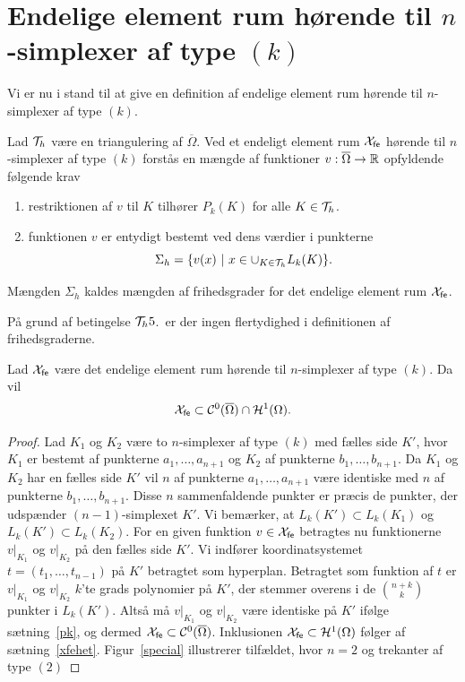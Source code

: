 \section{Endelige element rum hørende til $n$-sim\-plex\-er af type $(k)$}
Vi er nu i stand til at give en definition af endelige element rum
hørende til $n$-simplexer af type $(k)$.
\begin{definition}
Lad ${\cal{T}}_h$ være en triangulering af $\overline{\Omega}$. Ved et endeligt
element rum ${\mathcal{X}}_{\mathsf{fe}}$ hørende til $n$-simplexer af type $(k)$ forstås en
mængde af funktioner $v: \overline{\Omega} \rightarrow \mathbb{R}$ opfyldende 
følgende krav
\begin{enumerate}
 \item restriktionen af $v$ til $K$ tilhører $P_k(K)$ for alle
       $K\in {\cal{T}}_h$.
 \item funktionen $v$ er entydigt bestemt ved dens værdier i punkterne
       \begin{equation}
         \Sigma_h = \{ v(x)\ |\ x \in \cup_{K\in {\cal{T}}_h} L_k(K) \}.
       \end{equation}
\end{enumerate}
Mængden $\Sigma_h$ kaldes mængden af frihedsgrader for det endelige 
element rum ${\mathcal{X}}_{\mathsf{fe}}$.
\end{definition}
\begin{remark}
På grund af betingelse ${\cal{T}}_h 5$.\ er der ingen flertydighed i definitionen
af frihedsgraderne.
\end{remark}
\begin{theorem}
Lad ${\mathcal{X}}_{\mathsf{fe}}$ være det endelige element rum hørende til $n$-sim\-plex\-er
af type $(k)$. Da vil
\begin{equation} 
{\mathcal{X}}_{\mathsf{fe}} \subset {\cal{C}}^0(\overline{\Omega}) \cap {\mathcal H}^1(\Omega) .
\end{equation}
\end{theorem}
\begin{proof}
Lad $K_1$ og $K_2$ være to $n$-simplexer af type $(k)$ med fælles side
$K'$, hvor $K_1$ er bestemt af punkterne $a_1,\ldots,a_{n+1}$ og $K_2$ 
af punkterne $b_1,\ldots,b_{n+1}$. Da $K_1$ og $K_2$ har en fælles 
side $K'$ vil $n$ af punkterne $a_1,\ldots,a_{n+1}$ være identiske med
$n$ af punkterne $b_1,\ldots,b_{n+1}$. Disse $n$ sammenfaldende 
punkter er præcis de punkter, der udspænder $(n-1)$-simplexet $K'$.
Vi bemærker, at $L_k(K')\subset L_k(K_1)$ og $L_k(K')\subset L_k(K_2)$.
For en given funktion $v\in {\mathcal{X}}_{\mathsf{fe}}$ betragtes nu funktionerne $v|_{K_1}$ 
og $v|_{K_2}$ på den fælles side $K'$. Vi indfører koordinatsystemet
$t=(t_1,\ldots,t_{n-1})$ på $K'$ betragtet som hyperplan. Betragtet som
funktion af $t$ er $v|_{K_1}$ og $v|_{K_2}$ $k$'te grads polynomier
på $K'$, der stemmer overens i de $\binom{n+k}{k}$ 
punkter i $L_k(K')$. Altså må $v|_{K_1}$ og $v|_{K_2}$ være identiske
på $K'$ ifølge sætning~\ref{pk}, og dermed ${\mathcal{X}}_{\mathsf{fe}} \subset {\cal
C}^0(\overline{\Omega})$. Inklusionen ${\mathcal{X}}_{\mathsf{fe}}\subset\mathcal H^1(\Omega)$ følger af
sætning~\ref{xfehet}. Figur~\ref{special} illustrerer tilfældet, hvor $n=2$ og
trekanter af type $(2)$ 
\end{proof}

